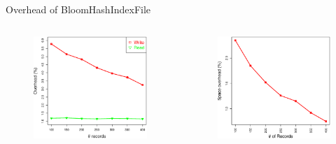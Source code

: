 \documentclass[newPxFont]{beamer}
\begin{document}
\begin{frame}[c]{Overhead of BloomHashIndexFile}
\vspace{-1.5cm}
\begin{columns}[T] %
    \begin{column}{.48\textwidth}
    \begin{figure}[ht!]
      \includegraphics[scale=0.3]{exp-bloomhash-rw-overhead}
      \centering
    \end{figure}
    \end{column}%
    \hfill%
    \begin{column}{.48\textwidth}
    \begin{figure}[ht!]
      \includegraphics[scale=0.3]{exp-bloomhash-space-overhead}
      \centering
    \end{figure} 
    \end{column}%
\end{columns}  
\end{frame}
\end{document}
